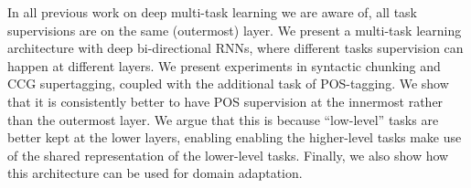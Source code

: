 In all previous work on deep multi-task learning we are aware of, all task supervisions are on the same (outermost) layer. We present a multi-task learning architecture with deep bi-directional RNNs, where different tasks supervision can happen at different layers. We present experiments in syntactic chunking and CCG supertagging, coupled with the additional task of POS-tagging. We show that it is consistently better to have POS supervision at the innermost rather than the outermost layer. We argue that this is because ``low-level'' tasks are better kept at the lower layers, enabling enabling the higher-level tasks make use of the shared representation of the lower-level tasks. Finally, we also show how this architecture can be used for domain adaptation.
